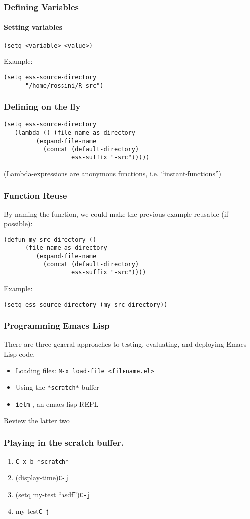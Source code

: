 \documentclass{beamer}
\begin{document}
\begin{frame}[fragile]
  \frametitle{Defining Variables}
  \framesubtitle{Setting variables}
\begin{verbatim}
(setq <variable> <value>)
\end{verbatim}
  Example:
\begin{verbatim}
(setq ess-source-directory
      "/home/rossini/R-src")
\end{verbatim}
\end{frame}

\begin{frame}[fragile]
  \frametitle{Defining on the fly}
\begin{verbatim}
(setq ess-source-directory
   (lambda () (file-name-as-directory
         (expand-file-name
           (concat (default-directory)
                   ess-suffix "-src")))))
\end{verbatim}
  (Lambda-expressions are anonymous functions, i.e. ``instant-functions'') 
\end{frame}


\begin{frame}[fragile]
  \frametitle{Function Reuse}
  By naming the function, we could make the previous example reusable
  (if possible):
\begin{verbatim}
(defun my-src-directory ()
      (file-name-as-directory
         (expand-file-name
           (concat (default-directory)
                   ess-suffix "-src"))))
\end{verbatim}
  Example:
\begin{verbatim}
(setq ess-source-directory (my-src-directory))
\end{verbatim}
\end{frame}

\begin{frame}[fragile]
  \frametitle{Programming Emacs Lisp} 

  There are three general approaches to testing, evaluating, and
  deploying Emacs Lisp code.
  \begin{itemize}
  \item Loading files:  \verb+M-x load-file <filename.el>+
  \item Using the \verb+*scratch*+ buffer
  \item \verb+ielm+ , an emacs-lisp REPL
  \end{itemize}
  Review the latter two
\end{frame}

\begin{frame}[fragile]
  \frametitle{Playing in the scratch buffer.}
  \begin{enumerate}
  \item \verb+C-x b *scratch*+
  \item (display-time)\verb+C-j+
  \item (setq my-test ``asdf'')\verb+C-j+
  \item my-test\verb+C-j+
  \end{enumerate}
\end{frame}
\end{document}
